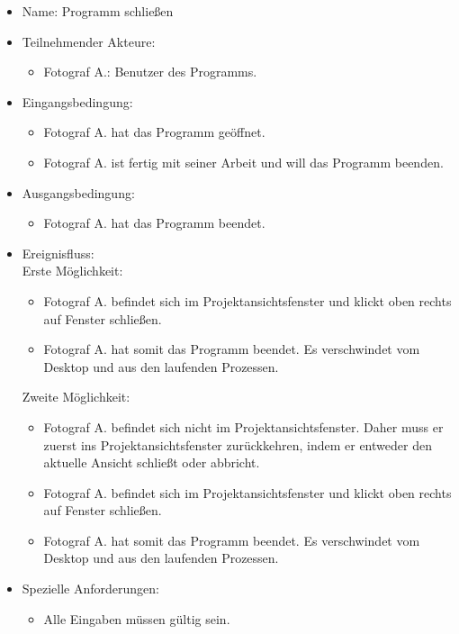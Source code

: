 	\begin{itemize}
		\item Name: Programm schließen
		\item Teilnehmender Akteure:
		\begin{itemize}
			\item	Fotograf A.: Benutzer des Programms.
		\end{itemize}
		\item Eingangsbedingung:
		\begin{itemize}
			\item Fotograf A. hat das Programm geöffnet.
			\item Fotograf A. ist fertig mit seiner Arbeit und will das Programm beenden.						
		\end{itemize}
		\item Ausgangsbedingung:
		\begin{itemize}
			\item	Fotograf A. hat das Programm beendet.		
		\end{itemize}
		\item Ereignisfluss:\\Erste Möglichkeit:	
		\begin{itemize}
			\item Fotograf A. befindet sich im Projektansichtsfenster und klickt oben rechts auf Fenster schließen.
			\item Fotograf A. hat somit das Programm beendet. Es verschwindet vom Desktop und aus den laufenden Prozessen.
		\end{itemize}
		Zweite Möglichkeit:
		\begin{itemize}
			\item Fotograf A. befindet sich nicht im Projektansichtsfenster. Daher muss er zuerst ins Projektansichtsfenster zurückkehren, indem er entweder den aktuelle Ansicht schließt oder abbricht.
			\item Fotograf A. befindet sich im Projektansichtsfenster und klickt oben rechts auf Fenster schließen.
			\item Fotograf A. hat somit das Programm beendet. Es verschwindet vom Desktop und aus den laufenden Prozessen.
		\end{itemize}	
		\item Spezielle Anforderungen:
		\begin{itemize}
			\item	Alle Eingaben müssen gültig sein.		
		\end{itemize}
	\end{itemize}
	
